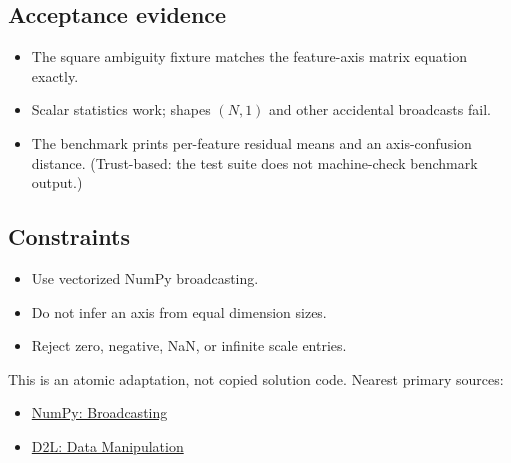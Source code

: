         \subsection{Acceptance evidence}

        \begin{evidencebox}
        \begin{itemize}
          \item The square ambiguity fixture matches the feature-axis matrix equation exactly.
  \item Scalar statistics work; shapes $(N,1)$ and other accidental broadcasts fail.
  \item The benchmark prints per-feature residual means and an axis-confusion distance. (Trust-based: the test suite does not machine-check benchmark output.)
        \end{itemize}
        \end{evidencebox}

        \subsection{Constraints}

        \begin{itemize}
          \item Use vectorized NumPy broadcasting.
  \item Do not infer an axis from equal dimension sizes.
  \item Reject zero, negative, NaN, or infinite scale entries.
        \end{itemize}

        \begin{sourcebox}
        This is an atomic adaptation, not copied solution code. Nearest primary sources:
        \begin{itemize}
          \item \href{https://numpy.org/doc/stable/user/basics.broadcasting.html}{NumPy: Broadcasting}
  \item \href{https://d2l.ai/chapter_preliminaries/ndarray.html}{D2L: Data Manipulation}
        \end{itemize}
        \end{sourcebox}
